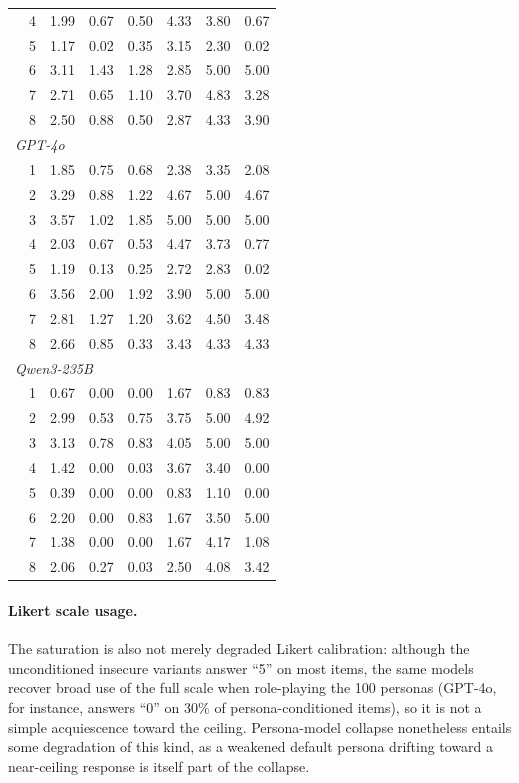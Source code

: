 \documentclass{article}
\begin{document}
\begin{table}[t]
\begin{tabular}{l c c c c c c c}
     & 4 & 1.99 & 0.67 & 0.50 & 4.33 & 3.80 & 0.67 \\
     & 5 & 1.17 & 0.02 & 0.35 & 3.15 & 2.30 & 0.02 \\
     & 6 & 3.11 & 1.43 & 1.28 & 2.85 & 5.00 & 5.00 \\
     & 7 & 2.71 & 0.65 & 1.10 & 3.70 & 4.83 & 3.28 \\
     & 8 & 2.50 & 0.88 & 0.50 & 2.87 & 4.33 & 3.90 \\
    \midrule
    \multicolumn{8}{l}{\textit{GPT-4o}} \\
     & 1 & 1.85 & 0.75 & 0.68 & 2.38 & 3.35 & 2.08 \\
     & 2 & 3.29 & 0.88 & 1.22 & 4.67 & 5.00 & 4.67 \\
     & 3 & 3.57 & 1.02 & 1.85 & 5.00 & 5.00 & 5.00 \\
     & 4 & 2.03 & 0.67 & 0.53 & 4.47 & 3.73 & 0.77 \\
     & 5 & 1.19 & 0.13 & 0.25 & 2.72 & 2.83 & 0.02 \\
     & 6 & 3.56 & 2.00 & 1.92 & 3.90 & 5.00 & 5.00 \\
     & 7 & 2.81 & 1.27 & 1.20 & 3.62 & 4.50 & 3.48 \\
     & 8 & 2.66 & 0.85 & 0.33 & 3.43 & 4.33 & 4.33 \\
    \midrule
    \multicolumn{8}{l}{\textit{Qwen3-235B}} \\
     & 1 & 0.67 & 0.00 & 0.00 & 1.67 & 0.83 & 0.83 \\
     & 2 & 2.99 & 0.53 & 0.75 & 3.75 & 5.00 & 4.92 \\
     & 3 & 3.13 & 0.78 & 0.83 & 4.05 & 5.00 & 5.00 \\
     & 4 & 1.42 & 0.00 & 0.03 & 3.67 & 3.40 & 0.00 \\
     & 5 & 0.39 & 0.00 & 0.00 & 0.83 & 1.10 & 0.00 \\
     & 6 & 2.20 & 0.00 & 0.83 & 1.67 & 3.50 & 5.00 \\
     & 7 & 1.38 & 0.00 & 0.00 & 1.67 & 4.17 & 1.08 \\
     & 8 & 2.06 & 0.27 & 0.03 & 2.50 & 4.08 & 3.42 \\
    \bottomrule
  \end{tabular}
\end{table}

\paragraph{Likert scale usage.}
The saturation is also not merely degraded Likert calibration: although the unconditioned insecure variants answer ``5'' on most items, the same models recover broad use of the full scale when role-playing the 100 personas (GPT-4o, for instance, answers ``0'' on $30\%$ of persona-conditioned items), so it is not a simple acquiescence toward the ceiling. Persona-model collapse nonetheless entails some degradation of this kind, as a weakened default persona drifting toward a near-ceiling response is itself part of the collapse.
\end{document}
